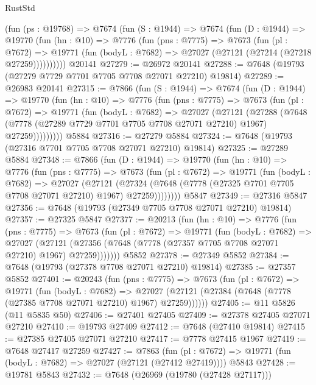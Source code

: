 \begin{lexlean}{RustStd}
\begin{coremodule}
{\begin{coremodule}
{{{{{{{{{{{{{{{{{{{{{{{{{{{{{{{{{{{{{{{{{{{{{{{{{{{{{    (fun (ps : @19768) =>
    @7674
      (fun (S : @1944) =>
      @7674
        (fun (D : @1944) =>
        @19770
          (fun (hn : @10) =>
          @7776
            (fun (pns : @7775) =>
            @7673
              (fun (pl : @7672) =>
              @19771 (fun (bodyL : @7682) => @27027 (@27121 (@27214 (@27218 @27259))))))))))
    @20141
@27279 := @26972 @20141
@27288 := @7648 (@19793 (@27279 @7729 @7701 @7705 @7708 @27071 @27210) @19814)
@27289 := @26983 @20141
@27315 := @7866
    (fun (S : @1944) =>
    @7674
      (fun (D : @1944) =>
      @19770
        (fun (hn : @10) =>
        @7776
          (fun (pns : @7775) =>
          @7673
            (fun (pl : @7672) =>
            @19771
              (fun (bodyL : @7682) =>
              @27027
                (@27121
                  (@27288
                    (@7648
                      (@7778 (@27289 @7729 @7701 @7705 @7708 @27071 @27210) @1967)
                      @27259)))))))))
    @5884
@27316 := @27279 @5884
@27324 := @7648 (@19793 (@27316 @7701 @7705 @7708 @27071 @27210) @19814)
@27325 := @27289 @5884
@27348 := @7866
    (fun (D : @1944) =>
    @19770
      (fun (hn : @10) =>
      @7776
        (fun (pns : @7775) =>
        @7673
          (fun (pl : @7672) =>
          @19771
            (fun (bodyL : @7682) =>
            @27027
              (@27121
                (@27324 (@7648 (@7778 (@27325 @7701 @7705 @7708 @27071 @27210) @1967) @27259))))))))
    @5847
@27349 := @27316 @5847
@27356 := @7648 (@19793 (@27349 @7705 @7708 @27071 @27210) @19814)
@27357 := @27325 @5847
@27377 := @20213
    (fun (hn : @10) =>
    @7776
      (fun (pns : @7775) =>
      @7673
        (fun (pl : @7672) =>
        @19771
          (fun (bodyL : @7682) =>
          @27027
            (@27121 (@27356 (@7648 (@7778 (@27357 @7705 @7708 @27071 @27210) @1967) @27259)))))))
    @5852
@27378 := @27349 @5852
@27384 := @7648 (@19793 (@27378 @7708 @27071 @27210) @19814)
@27385 := @27357 @5852
@27401 := @20243
    (fun (pns : @7775) =>
    @7673
      (fun (pl : @7672) =>
      @19771
        (fun (bodyL : @7682) =>
        @27027 (@27121 (@27384 (@7648 (@7778 (@27385 @7708 @27071 @27210) @1967) @27259))))))
@27405 := @11 @5826 (@11 @5835 @50)
@27406 := @27401 @27405
@27409 := @27378 @27405 @27071 @27210
@27410 := @19793 @27409
@27412 := @7648 (@27410 @19814)
@27415 := @27385 @27405 @27071 @27210
@27417 := @7778 @27415 @1967
@27419 := @7648 @27417 @27259
@27427 := @7863
    (fun (pl : @7672) => @19771 (fun (bodyL : @7682) => @27027 (@27121 (@27412 @27419))))
    @5843
@27428 := @19781 @5843
@27432 := @7648 (@26969 (@19780 (@27428 @27117)))
}}}}}}}}}}}}}}}}}}}}}}}}}}}}}}}}}}}}}}}}}}}}}}}}}}}}}
\end{coremodule}}
\end{coremodule}
\end{lexlean}
